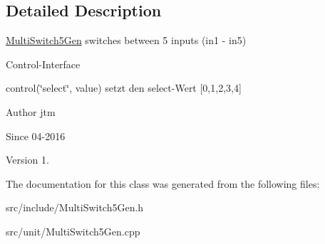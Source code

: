 \subsection{Detailed Description}
\hyperlink{classunit_1_1MultiSwitch5Gen}{Multi\-Switch5\-Gen} switches between 5 inputs (in1 -\/ in5)

Control-\/\-Interface


\begin{DoxyItemize}
\item control(\char`\"{}select\char`\"{}, value) setzt den select-\/\-Wert \mbox{[}0,1,2,3,4\mbox{]}
\end{DoxyItemize}

\begin{DoxyAuthor}{Author}
jtm 
\end{DoxyAuthor}
\begin{DoxySince}{Since}
04-\/2016 
\end{DoxySince}
\begin{DoxyVersion}{Version}
1. 
\end{DoxyVersion}


The documentation for this class was generated from the following files\-:\begin{DoxyCompactItemize}
\item 
src/include/Multi\-Switch5\-Gen.\-h\item 
src/unit/Multi\-Switch5\-Gen.\-cpp\end{DoxyCompactItemize}
